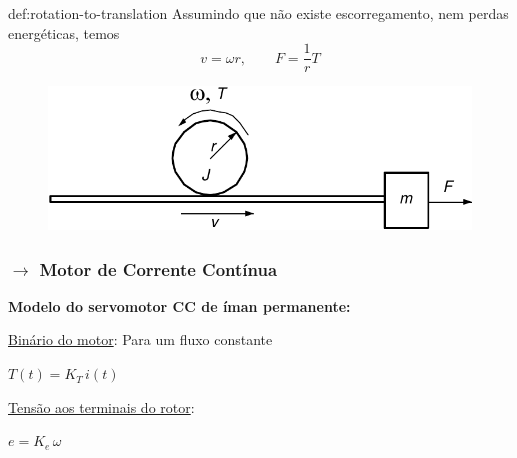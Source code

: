 \begin{theo}{def:rotation-to-translation}\label{def:rotation-to-translation}
Assumindo que não existe escorregamento, nem perdas energéticas, temos
$$
    v = \omega r,\qquad F = \frac{1}{r} T
$$
\vspace{-1em}
\begin{figure}[H]
    \centering
    \includegraphics[width = 0.6\linewidth]{img/mechanics/convertion.png}
    \label{fig:convertion}
\end{figure}
\end{theo}

\newpage
\subsubsection[3.2.2 Motor Corrente Contínua]{$\rightarrow$ Motor de Corrente Contínua}
\begin{mdframed}
\textbf{Modelo do servomotor CC de íman permanente:}

\noindent\underline{Binário do motor}: Para um fluxo constante

\noindent \hspace*{1.5 em}\raisebox{0.2 em}{$\drsh$} $T(t) = K_T\, i(t)$

\vspace{0.5em}
\noindent\underline{Tensão aos terminais do rotor}: 

\noindent \hspace*{1.5 em}\raisebox{0.2 em}{$\drsh$} $e = K_e\, \omega$

\end{mdframed}
